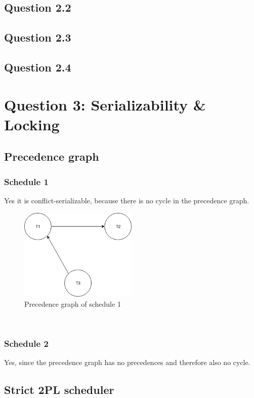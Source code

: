 \documentclass[12pt,a4paper]{article}
\begin{document}
\subsection{Question 2.2}

\subsection{Question 2.3}

\subsection{Question 2.4}

\section{Question 3: Serializability \& Locking}

\subsection{Precedence graph}
\subsubsection{Schedule 1}
Yes it is conflict-serializable, because there is no cycle in the precedence graph.
\begin{figure}[!htb]
	\center
	\includegraphics[width=0.5\textwidth]{img/schedule1}
	\caption{Precedence graph of schedule 1}
\end{figure}\\
\subsubsection{Schedule 2}
Yes, since the precedence graph has no precedences and therefore also no cycle.

\subsection{Strict 2PL scheduler}
\end{document}
